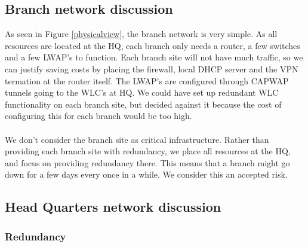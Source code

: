 
\subsection{Branch network discussion}


As seen in Figure \ref{physicalview}, the branch network is very simple. As all resources are located at the HQ, each branch only needs a router, a few switches and a few LWAP's to function. Each branch site will not have much traffic, so we can justify saving costs by placing the firewall, local DHCP server and the VPN termation at the router itself. The LWAP's are configured through CAPWAP tunnels going to the WLC's at HQ. We could have set up redundant WLC functionality on each branch site, but decided against it because the cost of configuring this for each branch would be too high.
\\
\\
We don't consider the branch site as critical infrastructure. Rather than providing each branch site with redundancy, we place all resources at the HQ, and focus on providing redundancy there. This means that a branch might go down for a few days every once in a while. We consider this an accepted risk.

\subsection{Head Quarters network discussion}




\subsubsection{Redundancy}

